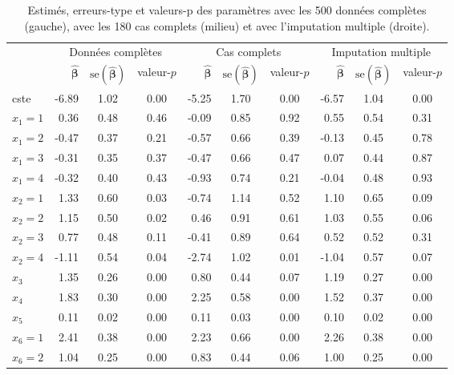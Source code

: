 \documentclass[
  11pt,
  letterpaper,
]{scrbook}
\theoremstyle{definition}
\theoremstyle{remark}
\begin{document}
\hypertarget{tbl-missing3r}{}
\begin{table}
\caption{\label{tbl-missing3r}Estimés, erreurs-type et valeurs-p des paramètres avec les 500 données
complètes (gauche), avec les 180 cas complets (milieu) et avec
l'imputation multiple (droite). }\tabularnewline

\centering
\begin{tabular}{lrccrccrcc}
\toprule
\multicolumn{1}{c}{} & \multicolumn{3}{c}{Données complètes} & \multicolumn{3}{c}{Cas complets} & \multicolumn{3}{c}{Imputation multiple} \\
\cmidrule(l{3pt}r{3pt}){2-4} \cmidrule(l{3pt}r{3pt}){5-7} \cmidrule(l{3pt}r{3pt}){8-10}
  & \(\widehat{\boldsymbol{\beta}}\) & \(\mathrm{se}(\widehat{\boldsymbol{\beta}})\) & valeur-\(p\) & \(\widehat{\boldsymbol{\beta}}\) & \(\mathrm{se}(\widehat{\boldsymbol{\beta}})\) & valeur-\(p\) & \(\widehat{\boldsymbol{\beta}}\) & \(\mathrm{se}(\widehat{\boldsymbol{\beta}})\) & valeur-\(p\)\\
\midrule
cste & -6.89 & 1.02 & 0.00 & -5.25 & 1.70 & 0.00 & -6.57 & 1.04 & 0.00\\
\(x_1=1\) & 0.36 & 0.48 & 0.46 & -0.09 & 0.85 & 0.92 & 0.55 & 0.54 & 0.31\\
\(x_1=2\) & -0.47 & 0.37 & 0.21 & -0.57 & 0.66 & 0.39 & -0.13 & 0.45 & 0.78\\
\(x_1=3\) & -0.31 & 0.35 & 0.37 & -0.47 & 0.66 & 0.47 & 0.07 & 0.44 & 0.87\\
\(x_1=4\) & -0.32 & 0.40 & 0.43 & -0.93 & 0.74 & 0.21 & -0.04 & 0.48 & 0.93\\
\addlinespace
\(x_2=1\) & 1.33 & 0.60 & 0.03 & -0.74 & 1.14 & 0.52 & 1.10 & 0.65 & 0.09\\
\(x_2=2\) & 1.15 & 0.50 & 0.02 & 0.46 & 0.91 & 0.61 & 1.03 & 0.55 & 0.06\\
\(x_2=3\) & 0.77 & 0.48 & 0.11 & -0.41 & 0.89 & 0.64 & 0.52 & 0.52 & 0.31\\
\(x_2=4\) & -1.11 & 0.54 & 0.04 & -2.74 & 1.02 & 0.01 & -1.04 & 0.57 & 0.07\\
\(x_3\) & 1.35 & 0.26 & 0.00 & 0.80 & 0.44 & 0.07 & 1.19 & 0.27 & 0.00\\
\addlinespace
\(x_4\) & 1.83 & 0.30 & 0.00 & 2.25 & 0.58 & 0.00 & 1.52 & 0.37 & 0.00\\
\(x_5\) & 0.11 & 0.02 & 0.00 & 0.11 & 0.03 & 0.00 & 0.10 & 0.02 & 0.00\\
\(x_6=1\) & 2.41 & 0.38 & 0.00 & 2.23 & 0.66 & 0.00 & 2.26 & 0.38 & 0.00\\
\(x_6=2\) & 1.04 & 0.25 & 0.00 & 0.83 & 0.44 & 0.06 & 1.00 & 0.25 & 0.00\\
\bottomrule
\end{tabular}
\end{table}
\end{document}
